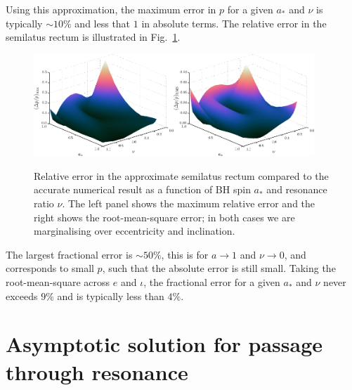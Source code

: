 \documentclass[aps,prd,amsfonts,amssymb,amsmath,nofootinbib,showpacs,superscriptaddress,twocolumn]{revtex4}
\newcommand{\figref}[1]{Fig.\ \ref{fig:#1}}
\begin{document}
Using this approximation, the maximum error in $p$ for a given $a_\ast$ and $\nu$ is typically $\sim10\%$ and less that $1$ in absolute terms. The relative error in the semilatus rectum is illustrated in \figref{p-error}. 
\begin{figure}[htp]
\centering
\centerline{\includegraphics[width=0.47\textwidth]{Fig_fit-error-max-plane}\quad\includegraphics[width=0.47\textwidth]{Fig_fit-error-RMS-plane}}
\caption{\label{fig:p-error}Relative error in the approximate semilatus rectum compared to the accurate numerical result as a function of BH spin $a_\ast$ and resonance ratio $\nu$. The left panel shows the maximum relative error and the right shows the root-mean-square error; in both cases we are marginalising over eccentricity and inclination.}
\end{figure}
The largest fractional error is $\sim50\%$, this is for $a\rightarrow 1$ and $\nu \rightarrow 0$, and corresponds to small $p$, such that the absolute error is still small. Taking the root-mean-square across $e$ and $\iota$, the fractional error for a given $a_\ast$ and $\nu$ never exceeds $9\%$ and is typically less than $4\%$.

\section{Asymptotic solution for passage through resonance}\label{sec:res-asymptotic}




\end{document}
